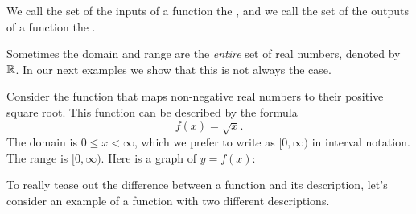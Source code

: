 \documentclass{ximera}
\begin{document}
\begin{definition}
  We call the set of the inputs of a function the
  , and we call the set of the outputs of a
  function the .
\end{definition}

Sometimes the domain and range are the \textit{entire} set of real
numbers, denoted by $\mathbb R$. In our next examples we show that this is
not always the case.

\begin{example}
Consider the function that maps non-negative real numbers to their
positive square root. This function can be described by the
formula
\[
f(x) = \sqrt{x}.
\]
The domain is $0\le x<\infty$, which we prefer to write as
$[0,\infty)$ in interval notation. The range is $[0,\infty)$.  Here is
    a graph of $y=f(x)$:
\begin{image}
\end{image}
\end{example}

To really tease out the difference between a function and its
description, let's consider an example of a function with two
different descriptions.
\end{document}

